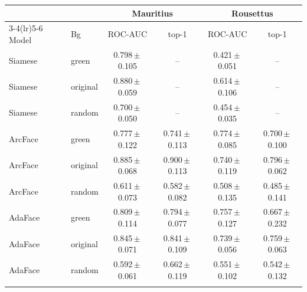 \begin{tabular}{llcccc}
\toprule
& & \multicolumn{2}{c}{Mauritius} & \multicolumn{2}{c}{Rousettus} \\
\cmidrule(lr){3-4}\cmidrule(lr){5-6}
Model & Bg & ROC-AUC & top-1 & ROC-AUC & top-1 \\
\midrule
Siamese & green & 0.798\,$\pm$\,0.105 & -- & 0.421\,$\pm$\,0.051 & -- \\
Siamese & original & 0.880\,$\pm$\,0.059 & -- & 0.614\,$\pm$\,0.106 & -- \\
Siamese & random & 0.700\,$\pm$\,0.050 & -- & 0.454\,$\pm$\,0.035 & -- \\
\addlinespace
ArcFace & green & 0.777\,$\pm$\,0.122 & 0.741\,$\pm$\,0.113 & 0.774\,$\pm$\,0.085 & 0.700\,$\pm$\,0.100 \\
ArcFace & original & 0.885\,$\pm$\,0.068 & 0.900\,$\pm$\,0.113 & 0.740\,$\pm$\,0.119 & 0.796\,$\pm$\,0.062 \\
ArcFace & random & 0.611\,$\pm$\,0.073 & 0.582\,$\pm$\,0.082 & 0.508\,$\pm$\,0.135 & 0.485\,$\pm$\,0.141 \\
\addlinespace
AdaFace & green & 0.809\,$\pm$\,0.114 & 0.794\,$\pm$\,0.077 & 0.757\,$\pm$\,0.127 & 0.667\,$\pm$\,0.232 \\
AdaFace & original & 0.845\,$\pm$\,0.071 & 0.841\,$\pm$\,0.109 & 0.739\,$\pm$\,0.056 & 0.759\,$\pm$\,0.063 \\
AdaFace & random & 0.592\,$\pm$\,0.061 & 0.662\,$\pm$\,0.119 & 0.551\,$\pm$\,0.102 & 0.542\,$\pm$\,0.132 \\
\addlinespace
\bottomrule
\end{tabular}
